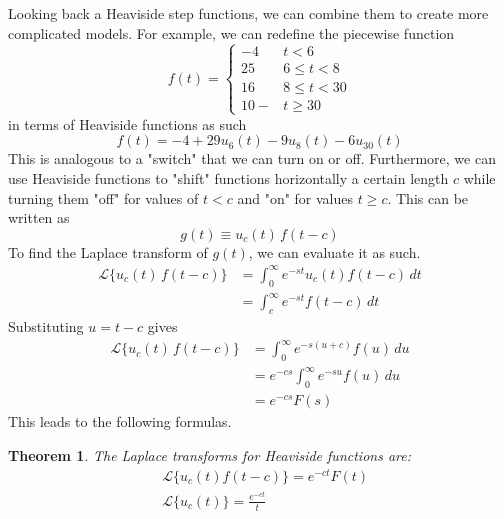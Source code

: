 \documentclass{article}
\newtheorem{theorem}{Theorem}[section]
\theoremstyle{remark}
\theoremstyle{definition}
\begin{document}
    Looking back a Heaviside step functions, we can combine them to create more complicated models. For example, we can redefine the piecewise function
    \[f(t) = \begin{cases}
    -4 & t < 6 \\
    25 & 6 \leq t < 8 \\
    16 & 8 \leq t < 30 \\
    10- & t \geq 30
    \end{cases}\]
    in terms of Heaviside functions as such
    \[f(t) = -4 + 29 u_6 (t) - 9 u_8 (t) - 6 u_{30} (t)\]
    This is analogous to a "switch" that we can turn on or off. Furthermore, we can use Heaviside functions to "shift" functions horizontally a certain length $c$ while turning them "off" for values of $t < c$ and "on" for values $t \geq c$. This can be written as 
    \[g(t) \equiv u_c (t) \, f(t - c)\]
    To find the Laplace transform of $g(t)$, we can evaluate it as such. 
    \begin{align*}
        \mathcal{L} \{u_c (t) \, f(t -c)\} & = \int_0^\infty e^{-s t} u_c (t) f(t-c) \,dt \\
        & = \int_c^\infty e^{-st} f(t-c) \,dt 
    \end{align*}
    Substituting $u = t - c$ gives
    \begin{align*}
         \mathcal{L} \{u_c (t) \, f(t -c)\} & = \int_0^\infty e^{-s (u+c)} f(u) \,du \\
         & = e^{-cs} \int_0^\infty e^{-su} f(u)\,du \\
         & = e^{-cs} F(s)
    \end{align*}
    This leads to the following formulas. 
    \begin{theorem}
    The Laplace transforms for Heaviside functions are:
    \begin{align*}
        & \mathcal{L} \{u_c (t) f(t-c)\} = e^{-ct} F(t) \\
        & \mathcal{L} \{u_c (t)\} = \frac{e^{-ct}}{t}
    \end{align*}
    \end{theorem}
\end{document}
